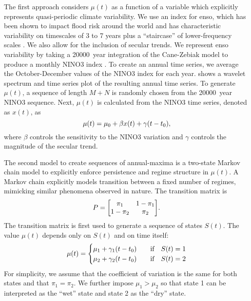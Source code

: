 \documentclass[
]{agujournal2018}
\begin{document}
The first approach considers $\mu(t)$ as a function of a variable which explicitly represents quasi-periodic climate variability.
We use an index for \gls{enso}, which has been shown to impact flood risk around the world \citep{Ropelewski:1987do, Ward:2014gg} and has characteristic variability on timescales of 3 to 7 years \citep{Sarachik:2009dr} plus a ``staircase'' of lower-frequency scales \citep{Jin:1994wq}.
We also allow for the inclusion of secular trends.
We represent \gls{enso} variability by taking a \SI{20000}{year} integration of the Cane-Zebiak model \citep{Zebiak:1987cl} to produce a monthly NINO3 index \citep{Ramesh:2016hf}.
To create an annual time series, we average the October-December values of the NINO3 index for each year.
 shows a wavelet spectrum and time series plot of the resulting annual time series.
To generate $\mu(t)$, a sequence of length $M+N$ is randomly chosen from the \SI{20000}{year} NINO3 sequence.
Next, $\mu(t)$ is calculated from the NINO3 time series, denoted as $x(t)$, as
\begin{equation}\label{eq:nino3}
  \mu(t) = \mu_0 + \beta x(t) + \gamma \qty(t - t_0),
\end{equation}
where $\beta$ controls the sensitivity to the NINO3 variation and $\gamma$ controls the magnitude of the secular trend.

The second model to create sequences of annual-maxima is a two-state Markov chain model to explicitly enforce persistence and regime structure in $\mu(t)$.
A Markov chain explicitly models transition between a fixed number of regimes, mimicking similar phenomena observed in nature.
The transition matrix is
\begin{equation}
  P = \mqty[\pi_1 & 1-\pi_1 \\ 1-\pi_2 & \pi_2].
\end{equation}
The transition matrix is first used to generate a sequence of states $S(t)$.
The value $\mu(t)$ depends only on $S(t)$ and on time itself:
\begin{equation}
  \mu(t) = \begin{cases}
    \mu_{1} + \gamma_1 \qty(t - t_0) & \qqtext{if} S(t) = 1 \\
    \mu_{2} + \gamma_2 \qty(t - t_0) & \qqtext{if} S(t) = 2
  \end{cases}
\end{equation}
For simplicity, we assume that the coefficient of variation is the same for both states and that $\pi_1=\pi_2$.
We further impose $\mu_{1} > \mu_{2}$ so that state 1 can be interpreted as the ``wet'' state and state 2 as the ``dry'' state.
\end{document}
